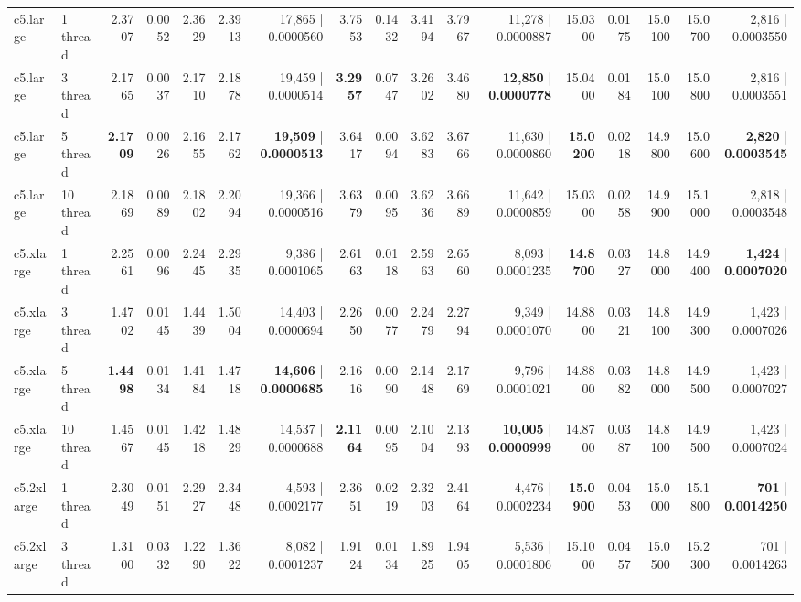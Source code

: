 \documentclass[conference]{IEEEtran}
\begin{document}
\begin{table}[h]
{\begin{tabular}{ll|rrrrr|rrrrr|rrrrr}
			c5.large & 1 thread & 2.3707 & 0.0052 & 2.3629 & 2.3913 & 17,865 | 0.0000560 & 3.7553 & 0.1432 & 3.4194 & 3.7967 & 11,278 | 0.0000887 & 15.0300 & 0.0175 & 15.0100 & 15.0700 & 2,816 | 0.0003550 \\
			c5.large & 3 thread & 2.1765 & 0.0037 & 2.1710 & 2.1878 & 19,459 | 0.0000514 & \textbf{3.2957} & 0.0747 & 3.2602 & 3.4680 & \textbf{12,850} | \textbf{0.0000778} & 15.0400 & 0.0184 & 15.0100 & 15.0800 & 2,816 | 0.0003551 \\
			c5.large & 5 thread & \textbf{2.1709} & 0.0026 & 2.1655 & 2.1762 & \textbf{19,509} | \textbf{0.0000513} & 3.6417 & 0.0094 & 3.6283 & 3.6766 & 11,630 | 0.0000860 & \textbf{15.0200} & 0.0218 & 14.9800 & 15.0600 & \textbf{2,820} | \textbf{0.0003545} \\
			c5.large & 10 thread & 2.1869 & 0.0089 & 2.1802 & 2.2094 & 19,366 | 0.0000516 & 3.6379 & 0.0095 & 3.6236 & 3.6689 & 11,642 | 0.0000859 & 15.0300 & 0.0258 & 14.9900 & 15.1000 & 2,818 | 0.0003548 \\
			\midrule
			c5.xlarge & 1 thread & 2.2561 & 0.0096 & 2.2445 & 2.2935 & 9,386 | 0.0001065 & 2.6163 & 0.0118 & 2.5963 & 2.6560 & 8,093 | 0.0001235 & \textbf{14.8700} & 0.0327 & 14.8000 & 14.9400 & \textbf{1,424} | \textbf{0.0007020} \\
			c5.xlarge & 3 thread & 1.4702 & 0.0145 & 1.4439 & 1.5004 & 14,403 | 0.0000694 & 2.2650 & 0.0077 & 2.2479 & 2.2794 & 9,349 | 0.0001070 & 14.8800 & 0.0321 & 14.8100 & 14.9300 & 1,423 | 0.0007026 \\
			c5.xlarge & 5 thread & \textbf{1.4498} & 0.0134 & 1.4184 & 1.4718 & \textbf{14,606} | \textbf{0.0000685} & 2.1616 & 0.0090 & 2.1448 & 2.1769 & 9,796 | 0.0001021 & 14.8800 & 0.0382 & 14.8000 & 14.9500 & 1,423 | 0.0007027 \\
			c5.xlarge & 10 thread & 1.4567 & 0.0145 & 1.4218 & 1.4829 & 14,537 | 0.0000688 & \textbf{2.1164} & 0.0095 & 2.1004 & 2.1393 & \textbf{10,005} | \textbf{0.0000999} & 14.8700 & 0.0387 & 14.8100 & 14.9500 & 1,423 | 0.0007024 \\
			\midrule
			c5.2xlarge & 1 thread & 2.3049 & 0.0151 & 2.2927 & 2.3448 & 4,593 | 0.0002177 & 2.3651 & 0.0219 & 2.3203 & 2.4164 & 4,476 | 0.0002234 & \textbf{15.0900} & 0.0453 & 15.0000 & 15.1800 & \textbf{701} | \textbf{0.0014250} \\
			c5.2xlarge & 3 thread & 1.3100 & 0.0332 & 1.2290 & 1.3622 & 8,082 | 0.0001237 & 1.9124 & 0.0134 & 1.8925 & 1.9405 & 5,536 | 0.0001806 & 15.1000 & 0.0457 & 15.0500 & 15.2300 & 701 | 0.0014263 \\

\end{tabular}}
\end{table}
\end{document}

